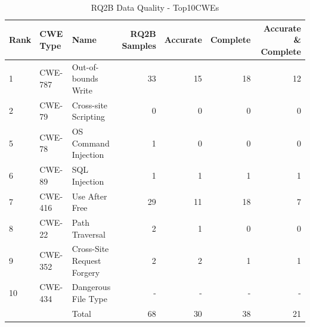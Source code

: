 \begin{table}
\centering
  \caption{RQ2B Data Quality - Top10CWEs}
  \label{Experiment:RQ3Adataset-AccuracyPerformance-Top10CWEs}
  \begin{tabular}{|l|l|l|r|r|r|r|}
    \hline
    Rank    & CWE Type & Name                          & RQ2B Samples   &Accurate &Complete & Accurate \& Complete\\
    \hline
    1       & CWE-787   & Out-of-bounds Write          &33              &15        &18      &12\\
    \hline
    2       & CWE-79    & Cross-site Scripting         &0               &0         &0       &0\\
    \hline
    5       & CWE-78    & OS Command Injection         &1               &0         &0       &0\\
    \hline
    6       & CWE-89    & SQL Injection                &1               & 1        &1       &1\\
    \hline
    7       & CWE-416   & Use After Free               &29              &11        &18      &7\\
    \hline
    8       & CWE-22    & Path Traversal               &2               & 1        &0       &0\\
    \hline
    9       & CWE-352   & Cross-Site Request Forgery   &2               & 2        &1       &1\\
    \hline
    10      & CWE-434   & Dangerous File Type          &-               &-         &-       &-\\
    \hline
            &           & Total                        &68              &30        &38      &21\\    
  \hline
\end{tabular}
\end{table}







